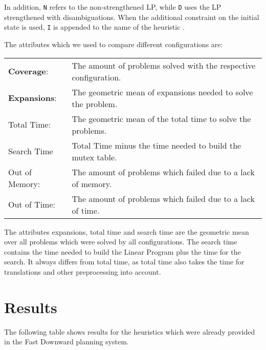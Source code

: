 In addition, \texttt{N} refers to the non-strengthened LP, while \texttt{D} uses the LP strengthened with disambiguations.
When the additional constraint on the initial state is used, \texttt{I} is appended to the name of the heuristic .

The attributes which we used to compare different configurations are:

\begin{center}
    \begin{tabularx}{\textwidth}{@{}lX@{}}
        \textbf{Coverage}: & The amount of problems solved with the respective configuration. \\
        \textbf{Expansions}: & The geometric mean of expansions needed to solve the problem. \\
        Total Time: & The geometric mean of the total time to solve the problems. \\
        Search Time & Total Time minus the time needed to build the mutex table. \\
        Out of Memory: & The amount of problems which failed due to a lack of memory. \\
        Out of Time: & The amount of problems which failed due to a lack of time. \\
    \end{tabularx}
\end{center}

The attributes expansions, total time and search time are the geometric mean over all problems which were solved by all configurations.
The search time contains the time needed to build the Linear Program plus the time for the search.
It always differs from total time, as total time also takes the time for translations and other preprocessing into account.

\section{Results}\label{sec:results}
The following table shows results for the heuristics which were already provided in the Fast Downward planning system.

